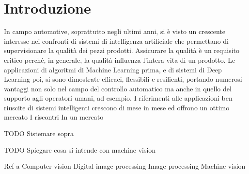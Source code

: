 
\chapter{Introduzione}

In campo automotive, soprattutto negli ultimi anni, si è visto un crescente interesse nei confronti di sistemi di intelligenza artificiale che permettano di supervisionare la qualità dei pezzi prodotti.
Assicurare la qualità è un requisito critico perché, in generale, la qualità influenza l'intera vita di un prodotto.
Le applicazioni di algoritmi di Machine Learning prima, e di sistemi di Deep Learning poi, si sono dimostrate efficaci, flessibili e resilienti, portando numerosi vantaggi non solo nel campo del controllo automatico ma anche in quello del supporto agli operatori umani, ad esempio.
I riferimenti alle applicazioni ben riuscite di sistemi intelligenti crescono di mese in mese ed offrono un ottimo mercato
I riscontri 
In un mercato 

TODO Sistemare sopra

TODO Spiegare cosa si intende con machine vision

Ref a
Computer vision
Digital image processing
Image processing
Machine vision
